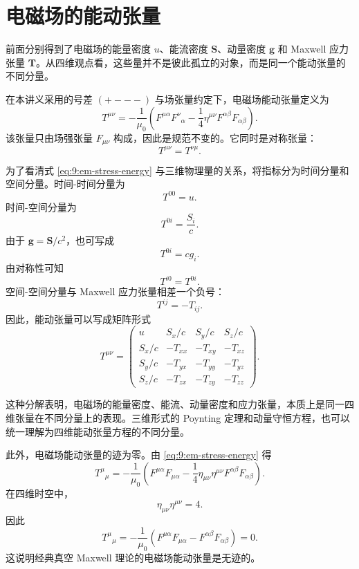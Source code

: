\section{电磁场的能动张量}

前面分别得到了电磁场的能量密度 $u$、能流密度 $\bm{S}$、动量密度 $\bm{g}$ 和 Maxwell 应力张量 $\mathbf T$。从四维观点看，这些量并不是彼此孤立的对象，而是同一个能动张量的不同分量。

在本讲义采用的号差 $(+---)$ 与场张量约定下，电磁场能动张量定义为
\begin{equation}
	T^{\mu\nu}
	=
	-\frac{1}{\mu_{0}}
	\left(
	F^{\mu\alpha}F^{\nu}{}_{\alpha}
	-
	\frac{1}{4}\eta^{\mu\nu}
	F^{\alpha\beta}F_{\alpha\beta}
	\right).
	\label{eq:9:em-stress-energy}
\end{equation}
该张量只由场强张量 $F_{\mu\nu}$ 构成，因此是规范不变的。它同时是对称张量：
\[
T^{\mu\nu}
=
T^{\nu\mu}.
\]

为了看清式 \eqref{eq:9:em-stress-energy} 与三维物理量的关系，将指标分为时间分量和空间分量。时间-时间分量为
\[
T^{00}
=
u.
\]
时间-空间分量为
\[
T^{0i}
=
\frac{S_{i}}{c}.
\]
由于 $\bm{g}=\bm{S}/c^{2}$，也可写成
\[
T^{0i}
=
cg_{i}.
\]
由对称性可知
\[
T^{i0}
=
T^{0i}.
\]
空间-空间分量与 Maxwell 应力张量相差一个负号：
\[
T^{ij}
=
-T_{ij}.
\]
因此，能动张量可以写成矩阵形式
\begin{equation}
	T^{\mu\nu}
	=
	\begin{pmatrix}
		u & S_{x}/c & S_{y}/c & S_{z}/c\\
		S_{x}/c & -T_{xx} & -T_{xy} & -T_{xz}\\
		S_{y}/c & -T_{yx} & -T_{yy} & -T_{yz}\\
		S_{z}/c & -T_{zx} & -T_{zy} & -T_{zz}
	\end{pmatrix}.
	\label{eq:9:em-stress-energy-matrix}
\end{equation}

这种分解表明，电磁场的能量密度、能流、动量密度和应力张量，本质上是同一四维张量在不同分量上的表现。三维形式的 Poynting 定理和动量守恒方程，也可以统一理解为四维能动张量方程的不同分量。

此外，电磁场能动张量的迹为零。由 \eqref{eq:9:em-stress-energy} 得
\[
T^{\mu}{}_{\mu}
=
-\frac{1}{\mu_{0}}
\left(
F^{\mu\alpha}F_{\mu\alpha}
-
\frac{1}{4}\eta_{\mu\nu}\eta^{\mu\nu}
F^{\alpha\beta}F_{\alpha\beta}
\right).
\]
在四维时空中，
\[
\eta_{\mu\nu}\eta^{\mu\nu}=4.
\]
因此
\[
T^{\mu}{}_{\mu}
=
-\frac{1}{\mu_{0}}
\left(
F^{\mu\alpha}F_{\mu\alpha}
-
F^{\alpha\beta}F_{\alpha\beta}
\right)
=
0.
\]
这说明经典真空 Maxwell 理论的电磁场能动张量是无迹的。

